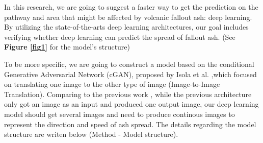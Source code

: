 \documentclass{article}
\begin{document}
\begin{doublespacing}
{  In this research, we are going to suggest a faster way to get the prediction on the pathway and 
  area that might be affected by volcanic fallout ash: deep learning. By utilizing the
  state-of-the-arts deep learning architectures, our goal includes verifying whether deep learning 
  can predict the spread of fallout ash. (See \textbf{Figure \ref{fig1}} for the model's structure)

  \fontsize{10pt}{10.5pt} 

  To be more specific, we are going to construct a model based on the conditional Generative 
  Adversarial Network (cGAN), proposed by Isola et al. \cite{isola2016imagetoimage},which focused on
  translating one image to the other type of image (Image-to-Image Translation). Comparing to the 
  previous work \cite{isola2016imagetoimage}, while the previous architecture only got an image as 
  an input and produced one output image, our deep learning model should get several images and need
  to produce continous images to represent the direction and speed of ash spread. The details 
  regarding the model structure are writen below (Method - Model structure).
}


\end{doublespacing}
\end{document}

